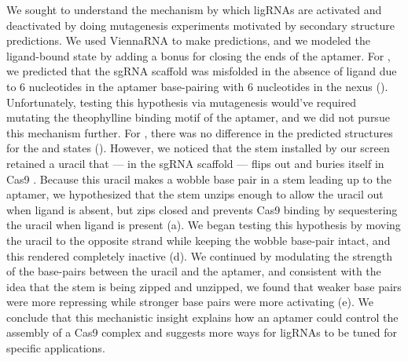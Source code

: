 \documentclass[10pt,oneside]{article}
\begin{document}



We sought to understand the mechanism by which ligRNAs are activated and deactivated by doing mutagenesis experiments motivated by \insilico{} secondary structure predictions.  We used ViennaRNA \autocite{lorenz2011} to make predictions, and we modeled the ligand-bound state by adding a  bonus for closing the ends of the aptamer.  For \ligrnaF{}, we predicted that the sgRNA scaffold was misfolded in the absence of ligand due to 6 nucleotides in the aptamer base-pairing with 6 nucleotides in the nexus ().  Unfortunately, testing this hypothesis via mutagenesis would've required mutating the theophylline binding motif of the aptamer, and we did not pursue this mechanism further.  For \ligrnaB{}, there was no difference in the predicted structures for the \apo{} and \holo{} states ().  However, we noticed that the stem installed by our screen retained a uracil that --- in the sgRNA scaffold --- flips out and buries itself in Cas9 \autocite{nishimasu2014}.  Because this uracil makes a wobble base pair in a stem leading up to the aptamer, we hypothesized that the stem unzips enough to allow the uracil out when ligand is absent, but zips closed and prevents Cas9 binding by sequestering the uracil when ligand is present (a).  We began testing this hypothesis by moving the uracil to the opposite strand while keeping the wobble base-pair intact, and this rendered \ligrnaB{} completely inactive (d).  We continued by modulating the strength of the base-pairs between the uracil and the aptamer, and consistent with the idea that the stem is being zipped and unzipped, we found that weaker base pairs were more repressing while stronger base pairs were more activating (e).  We conclude that this mechanistic insight explains how an aptamer could control the assembly of a Cas9 complex and suggests more ways for ligRNAs to be tuned for specific applications.
\end{document}
